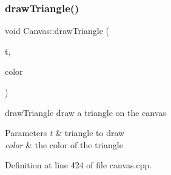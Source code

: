 \subsubsection{\texorpdfstring{draw\+Triangle()}{drawTriangle()}}
{\footnotesize\ttfamily void Canvas\+::draw\+Triangle (\begin{DoxyParamCaption}\item[{\hyperlink{class_triangle}{Triangle}}]{t,  }\item[{Q\+Color}]{color }\end{DoxyParamCaption})\hspace{0.3cm}{\ttfamily [private]}}



draw\+Triangle draw a triangle on the canvas 


\begin{DoxyParams}{Parameters}
{\em t} & triangle to draw \\
\hline
{\em color} & the color of the triangle \\
\hline
\end{DoxyParams}


Definition at line 424 of file canvas.\+cpp.


